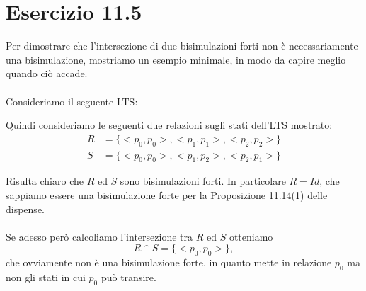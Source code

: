 \section*{Esercizio 11.5}

    
    Per dimostrare che l'intersezione di due bisimulazioni forti non è necessariamente una bisimulazione, mostriamo un esempio minimale, in modo da capire meglio quando ciò accade.\\
    \\
    Consideriamo il seguente LTS:
    \begin{figure}[h!]
        \centering
    \end{figure}
    
    Quindi consideriamo le seguenti due relazioni sugli stati dell'LTS mostrato:
    \begin{align*}
        R &= \{<p_0,p_0>, <p_1,p_1>, <p_2, p_2>\}\\
        S &= \{<p_0,p_0>, <p_1,p_2>, <p_2, p_1>\}
    \end{align*}
    
    Risulta chiaro che $R$ ed $S$ sono bisimulazioni forti. In particolare $R=Id$, che sappiamo essere una bisimulazione forte per la Proposizione 11.14(1) delle dispense.\\
    \\
    Se adesso però calcoliamo l'intersezione tra $R$ ed $S$ otteniamo
    \begin{equation*}
        R \cap S = \{<p_0,p_0>\},
    \end{equation*}
    che ovviamente non è una bisimulazione forte, in quanto mette in relazione $p_0$ ma non gli stati in cui $p_0$ può transire.
